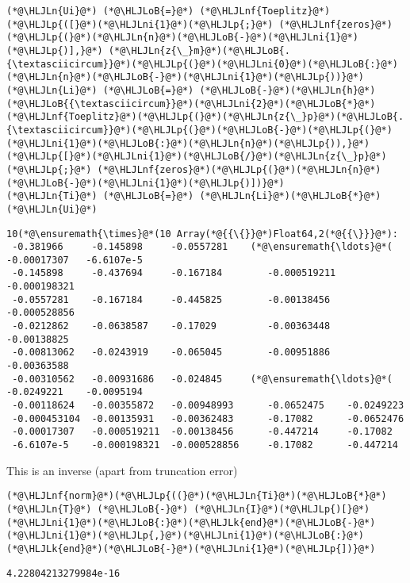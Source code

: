 \documentclass[12pt,a4paper]{article}
\newcommand{\HLJLk}[1]{\textcolor[RGB]{148,91,176}{\textbf{#1}}}
\newcommand{\HLJLn}[1]{#1}
\newcommand{\HLJLnf}[1]{\textcolor[RGB]{66,102,213}{#1}}
\newcommand{\HLJLni}[1]{\textcolor[RGB]{59,151,46}{#1}}
\newcommand{\HLJLoB}[1]{\textcolor[RGB]{102,102,102}{\textbf{#1}}}
\newcommand{\HLJLp}[1]{#1}
\begin{document}
\begin{lstlisting}
(*@\HLJLn{Ui}@*) (*@\HLJLoB{=}@*) (*@\HLJLnf{Toeplitz}@*)(*@\HLJLp{([}@*)(*@\HLJLni{1}@*)(*@\HLJLp{;}@*) (*@\HLJLnf{zeros}@*)(*@\HLJLp{(}@*)(*@\HLJLn{n}@*)(*@\HLJLoB{-}@*)(*@\HLJLni{1}@*)(*@\HLJLp{)],}@*) (*@\HLJLn{z{\_}m}@*)(*@\HLJLoB{.{\textasciicircum}}@*)(*@\HLJLp{(}@*)(*@\HLJLni{0}@*)(*@\HLJLoB{:}@*)(*@\HLJLn{n}@*)(*@\HLJLoB{-}@*)(*@\HLJLni{1}@*)(*@\HLJLp{))}@*)
(*@\HLJLn{Li}@*) (*@\HLJLoB{=}@*) (*@\HLJLoB{-}@*)(*@\HLJLn{h}@*)(*@\HLJLoB{{\textasciicircum}}@*)(*@\HLJLni{2}@*)(*@\HLJLoB{*}@*)(*@\HLJLnf{Toeplitz}@*)(*@\HLJLp{(}@*)(*@\HLJLn{z{\_}p}@*)(*@\HLJLoB{.{\textasciicircum}}@*)(*@\HLJLp{(}@*)(*@\HLJLoB{-}@*)(*@\HLJLp{(}@*)(*@\HLJLni{1}@*)(*@\HLJLoB{:}@*)(*@\HLJLn{n}@*)(*@\HLJLp{)),}@*) (*@\HLJLp{[}@*)(*@\HLJLni{1}@*)(*@\HLJLoB{/}@*)(*@\HLJLn{z{\_}p}@*)(*@\HLJLp{;}@*) (*@\HLJLnf{zeros}@*)(*@\HLJLp{(}@*)(*@\HLJLn{n}@*)(*@\HLJLoB{-}@*)(*@\HLJLni{1}@*)(*@\HLJLp{)])}@*)
(*@\HLJLn{Ti}@*) (*@\HLJLoB{=}@*) (*@\HLJLn{Li}@*)(*@\HLJLoB{*}@*)(*@\HLJLn{Ui}@*)
\end{lstlisting}

\begin{lstlisting}
10(*@\ensuremath{\times}@*(10 Array(*@{{\{}}@*)Float64,2(*@{{\}}}@*):
 -0.381966     -0.145898     -0.0557281    (*@\ensuremath{\ldots}@*(  -0.00017307   -6.6107e-5
 -0.145898     -0.437694     -0.167184        -0.000519211  -0.000198321
 -0.0557281    -0.167184     -0.445825        -0.00138456   -0.000528856
 -0.0212862    -0.0638587    -0.17029         -0.00363448   -0.00138825
 -0.00813062   -0.0243919    -0.065045        -0.00951886   -0.00363588
 -0.00310562   -0.00931686   -0.024845     (*@\ensuremath{\ldots}@*(  -0.0249221    -0.0095194
 -0.00118624   -0.00355872   -0.00948993      -0.0652475    -0.0249223
 -0.000453104  -0.00135931   -0.00362483      -0.17082      -0.0652476
 -0.00017307   -0.000519211  -0.00138456      -0.447214     -0.17082
 -6.6107e-5    -0.000198321  -0.000528856     -0.17082      -0.447214
\end{lstlisting}


This is an inverse (apart from truncation error)


\begin{lstlisting}
(*@\HLJLnf{norm}@*)(*@\HLJLp{((}@*)(*@\HLJLn{Ti}@*)(*@\HLJLoB{*}@*)(*@\HLJLn{T}@*) (*@\HLJLoB{-}@*) (*@\HLJLn{I}@*)(*@\HLJLp{)[}@*)(*@\HLJLni{1}@*)(*@\HLJLoB{:}@*)(*@\HLJLk{end}@*)(*@\HLJLoB{-}@*)(*@\HLJLni{1}@*)(*@\HLJLp{,}@*)(*@\HLJLni{1}@*)(*@\HLJLoB{:}@*)(*@\HLJLk{end}@*)(*@\HLJLoB{-}@*)(*@\HLJLni{1}@*)(*@\HLJLp{])}@*)
\end{lstlisting}

\begin{lstlisting}
4.22804213279984e-16
\end{lstlisting}
\end{document}
